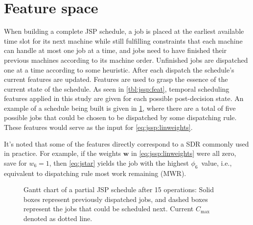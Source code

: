 \documentclass[graybox]{svmult}
\renewcommand{\vec}[1]{\mathbf{#1}}
\newcommand{\phiwrmJob}{$\phi_6$}
\begin{document}
\section{Feature space}\label{sec:feat}
When building a complete JSP schedule, a job is placed at the earliest 
available time slot for its next machine while still fulfilling constraints 
that each machine can handle at most one job at a time, and jobs need to have 
finished their previous machines according to its machine order. 
Unfinished jobs are dispatched one at a time according to some heuristic. After 
each dispatch the schedule's current features are updated.
Features are used to grasp the essence of the current state of the schedule. As 
seen in \cref{tbl:jssp:feat}, temporal scheduling features applied in this 
study are given for each possible post-decision state. An example of a schedule 
being built is given in \cref{fig:jssp:example}, where there are a total of 
five possible jobs that could be chosen to be dispatched by some dispatching 
rule. These features would serve as the input for \cref{eq:jssp:linweights}. 

It's noted that some of the features directly correspond to a SDR commonly used 
in practice. For example, if the weights $\vec{w}$ in \cref{eq:jssp:linweights} 
were all zero, save for $w_6=1$, then \cref{eq:jstar} yields the job with the 
highest \phiwrmJob\ value, i.e., equivalent  to dispatching rule most work 
remaining (MWR).

\begin{figure}[p]\centering 
	\caption[Gantt chart of a partial JSP schedule]{Gantt chart of a partial 
		JSP schedule after 15 operations: Solid boxes represent 
		previously         
		dispatched jobs, and dashed boxes represent the jobs that could be 
		scheduled next. Current $C_{\max}$ denoted as dotted line.}
	\label{fig:jssp:example}
\end{figure}
\end{document}
